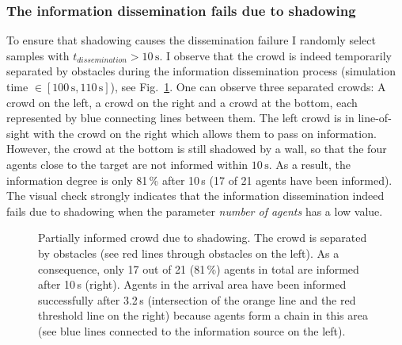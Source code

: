 

\subsubsection{The information dissemination fails due to shadowing}
To ensure that shadowing causes the dissemination failure I randomly select samples with $t_{dissemination}>10\,\text{s}$. I observe that the crowd is indeed temporarily separated by obstacles during the information dissemination process (simulation time $\in [100\,\text{s}, 110\,\text{s}]$), see Fig.~\ref{fig:shadowingexample}. One can observe three separated crowds: A crowd on the left, a crowd on the right and a crowd at the bottom, each represented by blue connecting lines between them. The left crowd is in line-of-sight with the crowd on the right which allows them to pass on information. However, the crowd at the bottom is still shadowed by a wall, so that the four agents close to the target are not informed within $10\,\text{s}$. As a result, the information degree is only  81\,\% after 10\,s (17 of 21 agents have been informed). The visual check strongly indicates that the information dissemination indeed fails due to shadowing when the parameter \textit{number of agents} has a low value.  

\begin{figure}[hbt!]

\caption[Partially informed crowd due to shadowing]{Partially informed crowd due to shadowing. The crowd is separated by obstacles (see red lines through obstacles on the left). As a consequence, only 17 out of 21 (81\,\%) agents in total are informed after 10\,s (right). Agents in the arrival area have been informed successfully after 3.2\,s (intersection of the orange line and the red threshold line on the right) because agents form a chain in this area (see blue lines connected to the information source on the left). }
\label{fig:shadowingexample}
\end{figure}
 




